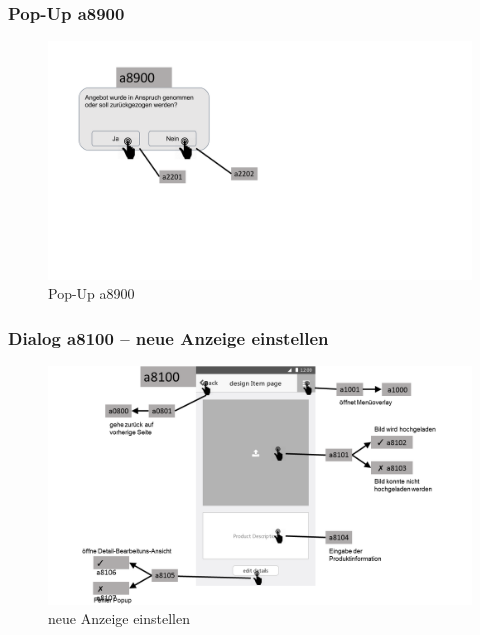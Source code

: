 \documentclass[a4paper,12pt,oneside]{scrartcl}
\begin{document}
\subsubsection{Pop-Up a8900}
\begin{figure}[!htbp]
\centering
\noindent\includegraphics[width=\linewidth,height=\textheight,keepaspectratio]{Dialoge/a8900p}
\caption{Pop-Up a8900}
\end{figure}
\FloatBarrier

\subsubsection{Dialog a8100 – neue Anzeige einstellen }
\begin{figure}[!htbp]
\centering
\noindent\includegraphics[width=\linewidth,height=\textheight,keepaspectratio]{Dialoge/a8100}
\caption{neue Anzeige einstellen}
\end{figure}
\FloatBarrier
\end{document}
